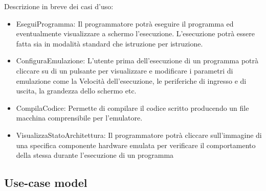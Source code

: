 \documentclass[11pt]{article}
\begin{document}
Descrizione in breve dei casi d’uso:
\begin{itemize}
\item{
	EseguiProgramma: Il programmatore potrà eseguire il programma ed eventualmente visualizzare a schermo l’esecuzione. L’esecuzione potrà essere fatta sia in modalità standard che istruzione per istruzione.
}
\item{
	ConfiguraEmulazione: L’utente prima dell’esecuzione di un programma potrà cliccare su di un pulsante per visualizzare e modificare i parametri di emulazione come la Velocità dell’esecuzione, le periferiche di ingresso e di uscita, la grandezza dello schermo etc. 
}
\item{
	CompilaCodice: Permette di compilare il codice scritto producendo un file macchina comprensibile per l’emulatore.
}
\item{
	VisualizzaStatoArchitettura: Il programmatore potrà cliccare sull’immagine di una specifica componente hardware emulata per verificare il comportamento della stessa durante l’esecuzione di un programma
}
\end{itemize}\clearpage
\subsection{Use-case model}
\end{document}
